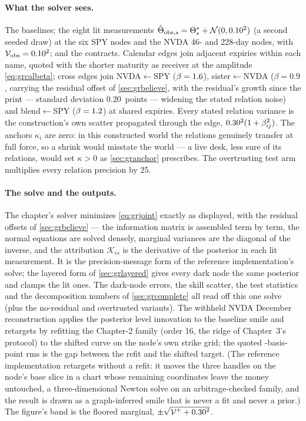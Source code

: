 \paragraph{What the solver sees.}
The baselines; the eight lit measurements
$\hat\Theta_{\mathrm{obs},s}=\Theta^{*}_s+
\mathcal{N}(0,0.10^{2})$ (a second seeded draw) at the six SPY
nodes and the NVDA 46- and 228-day nodes, with
$\mathcal{V}_{\mathrm{obs}}=0.10^{2}$; and the contracts.
Calendar edges join adjacent expiries within each name, quoted with
the shorter maturity as receiver at the amplitude
\cref{eq:grcalbeta}; cross edges join NVDA${\leftarrow}$SPY
($\beta=1.6$), sister${\leftarrow}$NVDA ($\beta=0.9$,
carrying the residual offset of \cref{sec:grbelieve}, with the
residual's growth since the print --- standard deviation
$0.20$~points --- widening the stated relation noise) and
blend${\leftarrow}$SPY
($\beta=1.2$) at shared expiries.  Every stated relation
variance is the construction's own scatter propagated through the
edge, $0.30^{2}(1+\beta_{ij}^{2})$.  The anchors
$\kappa_i$ are zero: in this constructed world the relations
genuinely transfer at full force, so a shrink would misstate the
world --- a live desk, less sure of its relations, would set
$\kappa>0$ as \cref{sec:granchor} prescribes.  The overtrusting test
arm multiplies every relation precision by $25$.

\paragraph{The solve and the outputs.}
The chapter's solver minimizes \cref{eq:grjoint} exactly as
displayed, with the residual offsets of \cref{sec:grbelieve} ---
the information matrix is assembled term by term, the normal
equations are solved densely, marginal variances are the diagonal of
the inverse, and the attribution $\mathcal{K}_{is}$ is the
derivative of the posterior in each lit measurement.  It is the
precision-message form of the reference implementation's solve; the
layered form of \cref{sec:grlayered} gives every dark node the same
posterior and clamps the lit ones.  The
dark-node errors, the skill scatter, the test statistics and the
decomposition numbers of \cref{sec:grcomplete} all read off this one
solve (plus the no-residual and overtrusted variants).  The withheld
NVDA December reconstruction applies the posterior level innovation
to the baseline smile and retargets by refitting the Chapter-2 family
(order 16, the ridge of Chapter~3's protocol) to the shifted curve on
the node's own strike grid; the quoted \MacGrRetargetRmsBp-basis-point
rms is the gap between the refit and the shifted target.  (The
reference implementation retargets without a refit: it moves the
three handles on the node's base slice in a chart whose remaining
coordinates leave the money untouched, a three-dimensional Newton
solve on an arbitrage-checked family, and the result is drawn as a
graph-inferred smile that is never a fit and never a prior.)  The
figure's band is the floored marginal,
$\pm\sqrt{\smash[b]{\mathcal{V}^{+}+0.30^{2}}}$.

